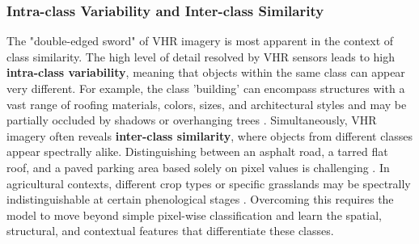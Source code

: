 \documentclass{report}
\begin{document}
\subsubsection{Intra-class Variability and Inter-class Similarity}
The "double-edged sword" of VHR imagery is most apparent in the context of class similarity. The high level of detail resolved by VHR sensors leads to high \textbf{intra-class variability}, meaning that objects within the same class can appear very different. For example, the class 'building' can encompass structures with a vast range of roofing materials, colors, sizes, and architectural styles and may be partially occluded by shadows or overhanging trees \parencites[p.~3;]{QinLiuReviewLandcoverClassificationVeryHighResolutionRemotelySensedOpticalImagesAnalysisUnitModelScalabilityTransferability2022}[p.~2;]{SertelEtAlLandUseLandCoverMappingUsingDeepLearningBasedSegmentationApproachesVHRWorldview3Images2022}[p.~1f.]{NeupaneEtAlDeepLearningBasedSemanticSegmentationUrbanFeaturesSatelliteImagesReviewMetaAnalysis2021}. Simultaneously, VHR imagery often reveals \textbf{inter-class similarity}, where objects from different classes appear spectrally alike. Distinguishing between an asphalt road, a tarred flat roof, and a paved parking area based solely on pixel values is challenging \parencites[p.~3;]{QinLiuReviewLandcoverClassificationVeryHighResolutionRemotelySensedOpticalImagesAnalysisUnitModelScalabilityTransferability2022}\parencites[p.~2]{NeupaneEtAlDeepLearningBasedSemanticSegmentationUrbanFeaturesSatelliteImagesReviewMetaAnalysis2021}. In agricultural contexts, different crop types or specific grasslands may be spectrally indistinguishable at certain phenological stages \parencite[p.~2]{SertelEtAlLandUseLandCoverMappingUsingDeepLearningBasedSegmentationApproachesVHRWorldview3Images2022}. Overcoming this requires the model to move beyond simple pixel-wise classification and learn the spatial, structural, and contextual features that differentiate these classes.
\end{document}
